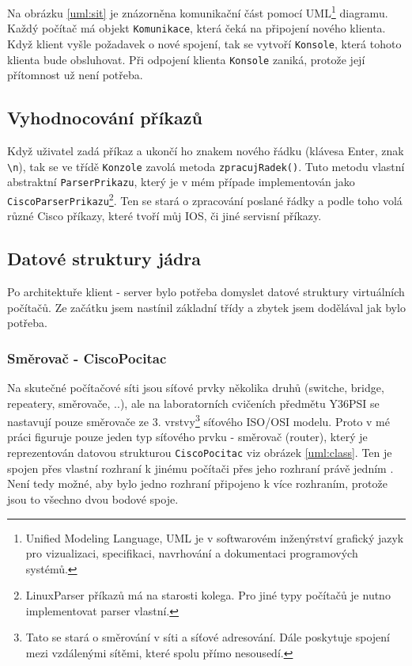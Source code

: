 Na obrázku \ref{uml:sit} je znázorněna komunikační část pomocí UML\footnote{Unified Modeling Language, UML je v softwarovém inženýrství grafický jazyk pro vizualizaci, specifikaci, navrhování a dokumentaci programových systémů.\cite{wiki:uml}} diagramu. Každý počítač má objekt \verb|Komunikace|, která čeká na připojení nového klienta. Když klient vyšle požadavek o nové spojení, tak se vytvoří \verb|Konsole|, která tohoto klienta bude obsluhovat. Při odpojení klienta \verb|Konsole| zaniká, protože její přítomnost už není potřeba.


\subsection{Vyhodnocování příkazů}
Když uživatel zadá příkaz a ukončí ho znakem nového řádku (klávesa Enter, znak \verb|\n|), tak se ve třídě \verb|Konzole| zavolá metoda \verb|zpracujRadek()|. Tuto metodu vlastní abstraktní \verb|ParserPrikazu|, který je v mém případe implementován jako \verb|CiscoParserPrikazu|\footnote{LinuxParser příkazů má na starosti kolega. Pro jiné typy počítačů je nutno implementovat parser vlastní.}. Ten se stará o zpracování poslané řádky a podle toho volá různé Cisco příkazy, které tvoří můj IOS, či jiné servisní příkazy.



\subsection{Datové struktury jádra}

Po architektuře klient - server bylo potřeba domyslet datové struktury virtuálních počítačů. Ze začátku jsem nastínil základní třídy a zbytek jsem dodělával jak bylo potřeba. 

\subsubsection{Směrovač - CiscoPocitac}
Na skutečné počítačové síti jsou síťové prvky několika druhů (switche, bridge, repeatery, směrovače, ..), ale na laboratorních cvičeních předmětu Y36PSI se  nastavují pouze směrovače ze 3. vrstvy\footnote{Tato  se stará o směrování v síti a síťové adresování. Dále poskytuje spojení mezi vzdálenými sítěmi, které spolu přímo nesousedí.} síťového ISO/OSI modelu. Proto v mé práci figuruje pouze jeden typ síťového prvku - směrovač (router), který je reprezentován datovou strukturou \verb|CiscoPocitac| viz obrázek \ref{uml:class}. Ten je spojen přes vlastní rozhraní k jinému počítači přes jeho rozhraní právě jedním . Není tedy možné, aby bylo jedno rozhraní připojeno k více rozhraním, protože jsou to všechno dvou bodové spoje. 

